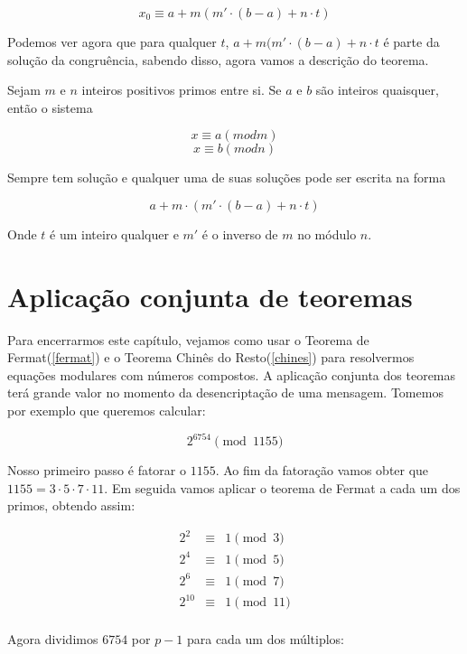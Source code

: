 $$ x_0 \equiv a + m (m'\cdot(b-a)+n \cdot t) $$


Podemos ver agora que para qualquer $t$, $a + m (m'\cdot(b-a)+n \cdot t$ \'e parte da solu\c{c}\~ao da congru\^encia, sabendo disso, agora vamos a descri\c{c}\~ao do teorema.


\begin{Th}\label{chines}

Sejam $m$ e $n$ inteiros positivos primos entre si. Se $a$ e $b$ s\~ao inteiros quaisquer, ent\~ao o sistema

$$ x \equiv a (mod m) $$
$$ x \equiv b (mod n) $$

Sempre tem solu\c{c}\~ao e qualquer uma de suas solu\c{c}\~oes pode ser escrita na forma

$$ a + m \cdot(m' \cdot (b-a) + n \cdot t) $$

Onde $t$ \'e um inteiro qualquer e $m'$ \'e o inverso de $m$ no m\'odulo $n$.

\end{Th}

\section{Aplica\c{c}\~ao conjunta de teoremas}

Para encerrarmos este cap\'itulo, vejamos como usar o Teorema de Fermat(\ref{fermat}) e o Teorema Chin\^es do Resto(\ref{chines}) para resolvermos equa\c{c}\~oes modulares com n\'umeros compostos. A aplica\c{c}\~ao conjunta dos teoremas ter\'a grande valor no momento da desencripta\c{c}\~ao de uma mensagem. Tomemos por exemplo que queremos calcular:

$$ 2^{6754} \pmod{1155}$$

Nosso primeiro passo \'e fatorar o $1155$. Ao fim da fatora\c{c}\~ao vamos obter que $1155 = 3 \cdot 5 \cdot 7 \cdot 11$. Em seguida vamos aplicar o teorema de Fermat a cada um dos primos, obtendo assim:

\[
\begin{array}{rcl}
 2^2 		&	\equiv 	&	1 \pmod{3}\\
 2^4 		&	\equiv 	&	1 \pmod{5}\\
 2^6 		&	\equiv 	&	1 \pmod{7}\\ 
 2^{10} &	\equiv 	&	1 \pmod{11}\\
\end{array}
\]

Agora dividimos $6754$ por $p-1$ para cada um dos m\'ultiplos:

